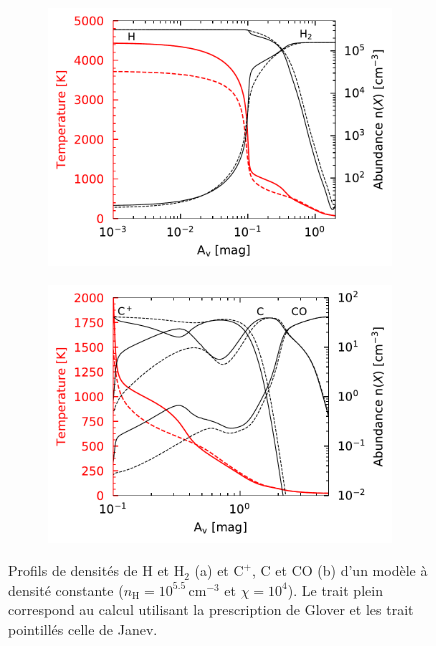 \begin{figure}[!h]
    \centering
    \begin{subfigure}[t]{0.49\textwidth} %
        \centering \includegraphics[trim = {0 0 0 0 },clip,width=1\textwidth]{figure/H2/bosse_dcte_janevVSglover/profilT.pdf}
        \caption{}
        \label{fig:H2:bosse:plotH}
    \end{subfigure}
    \begin{subfigure}[t]{0.49\textwidth}
        \centering \includegraphics[trim = {0 0 0 0 },clip,width=1\textwidth]{figure/H2/bosse_dcte_janevVSglover/Cp_C_CO.pdf}
        \caption{}
    \label{fig:H2:bosse:plotC}
    \end{subfigure}
    \caption{Profils de densités de $\mathrm{H}$ et $\mathrm{H}_2$ (a) et $\mathrm{C}^+$, $\mathrm{C}$ et $\mathrm{CO}$ (b) d'un modèle à densité constante ($n_\mathrm{H} = 10^{5.5}\,\mathrm{cm}^{-3}$ et $\chi = 10^4$). Le trait plein correspond au calcul utilisant la prescription de Glover et les trait pointillés celle de Janev.}
    
\end{figure}

